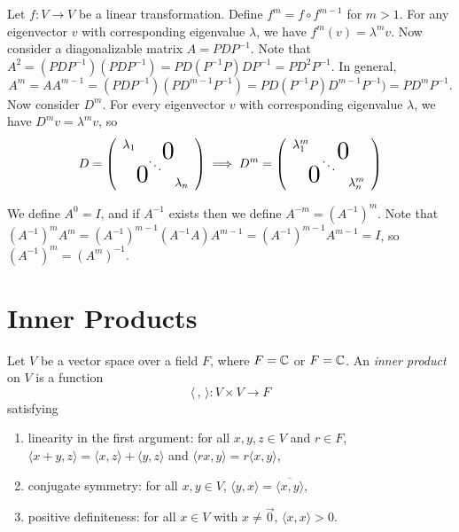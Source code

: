 Let $f: V \to V$ be a linear transformation. Define $f^m = f \circ f^{m-1}$ for $m > 1$. For any eigenvector $v$ with corresponding eigenvalue $\lambda$, we have $f^m(v) = \lambda^{m}v$. Now consider a diagonalizable matrix $A = PDP^{-1}$. Note that $A^2 = (PDP^{-1})(PDP^{-1}) = PD(P^{-1}P)DP^{-1} = PD^2P^{-1}$. In general, \[A^m = AA^{m-1} = (PDP^{-1})(PD^{m-1}P^{-1}) = PD(P^{-1}P)D^{m-1}P^{-1}) = PD^mP^{-1}.\] Now consider $D^m$. For every eigenvector $v$ with corresponding eigenvalue $\lambda$, we have $D^mv = \lambda^mv$, so
\[D = \left(\begin{array}{ccc}
    \lambda_1 & \largeblock{2}{-0.7}{0} \\
    & \ddots & \\
    \largeblock{2}{0.7}{0} & \lambda_n \\
\end{array}
\right) \implies D^m =\left(\begin{array}{ccc}
    \lambda_1^m & \largeblock{2}{-0.7}{0} \\
    & \ddots & \\
    \largeblock{2}{0.7}{0} & \lambda_n^m \\
\end{array}
\right)\]

We define $A^0 = I$, and if $A^{-1}$ exists then we define $A^{-m} = (A^{-1})^m$. Note that $(A^{-1})^mA^m = (A^{-1})^{m-1}(A^{-1}A)A^{m-1} = (A^{-1})^{m-1}A^{m-1} = I$, so $(A^{-1})^m = (A^m)^{-1}$.

\section{Inner Products}

\begin{defn}
    Let $V$ be a vector space over a field $F$, where $F = \mathbb{C}$ or $F = \mathbb{C}$. An \emph{inner product} on $V$ is a function
    \[\langle\,,\,\rangle: V \times V \to F\]
    satisfying
    \begin{enumerate}[label=(\arabic*)]
        \item linearity in the first argument: for all $x, y, z \in V$ and $r \in F$, $\langle x+y, z\rangle = \langle x,z\rangle + \langle y,z \rangle$ and $\langle rx, y\rangle = r\langle x,y\rangle$,
        \item conjugate symmetry: for all $x, y \in V$, $\langle y, x\rangle = \overline{\langle x, y\rangle}$,
        \item positive definiteness: for all $x \in V$ with $x \neq \vec{0}$, $\langle x, x \rangle > 0$.
    \end{enumerate}
\end{defn}

